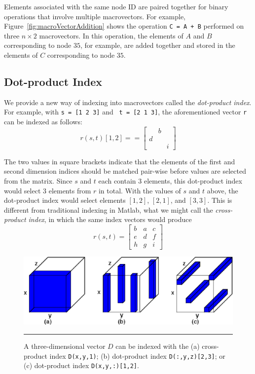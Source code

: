 Elements associated with the same node ID are paired together for binary
operations that involve multiple macrovectors.  For example,
Figure~\ref{fig:macroVectorAddition} shows the operation {\tt C = A + B}
performed on three $n \times 2$ macrovectors. In this operation, the elements of
$A$ and $B$ corresponding to node $35$, for example, are added together and
stored in the elements of $C$ corresponding to node $35$.

\subsection{Dot-product Index} \label{sect:dotProduct}
We provide a new way of indexing into macrovectors called the {\em
dot-product index}.  For example, with {\tt s~=~[1~2~3]} and {\tt
  t~=~[2~1~3]}, the aforementioned vector {\tt r} can be indexed as follows:
 \[ r(s,t)[1,2] == \left[ \begin{array}{ccc}
  & b &   \\
d &   &   \\
  &   & i \end{array} \right]\]

The two values in square brackets indicate that the elements of the
first and second dimension indices should be matched pair-wise before
values are selected from the matrix.  Since $s$ and $t$ each contain 3
elements, this dot-product index would select 3 elements from $r$ in
total.  With the values of $s$ and $t$ above, the dot-product index
would select elements $[1, 2]$, $[2, 1]$, and $[3, 3]$.  This is
different from traditional indexing in Matlab, what we might call
the {\em cross-product index}, in which the same index vectors would
produce
\[ r(s,t) = \left[ \begin{array}{ccc}
b & a & c \\
e & d & f \\
h & g & i \end{array} \right]\]

\begin{figure}[t]
  \centering
  \includegraphics[width=1\columnwidth]{fig/DotProducts}
  \smallskip
  \hrule
  \caption[Example of dot-product indexing]{A three-dimensional vector $D$ can
    be indexed with the (a) cross-product index {\tt D(x,y,1)}; (b) dot-product
    index {\tt D(:,y,z)[2,3]}; or (c) dot-product index {\tt D(x,y,:)[1,2]}.}
  \label{fig:dotProduct}
\end{figure}

